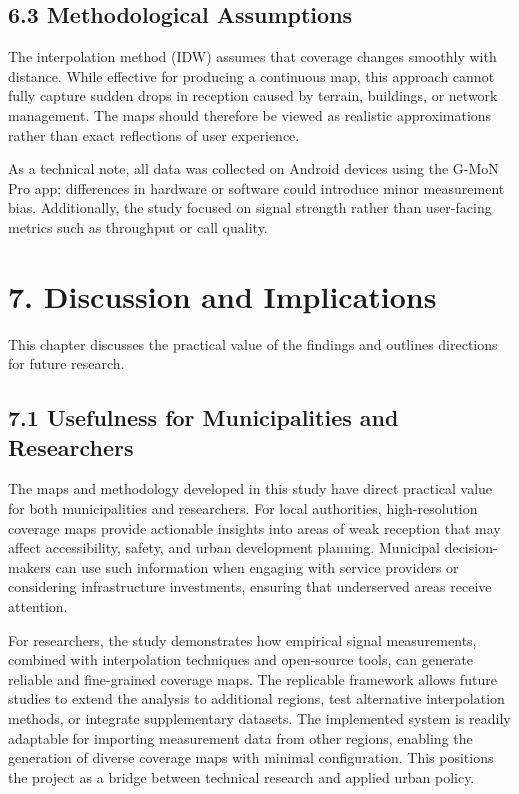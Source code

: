 \documentclass[11pt]{article}
\begin{document}
\hypertarget{methodological-assumptions}{%
\subsection{6.3 Methodological
Assumptions}\label{methodological-assumptions}}

The interpolation method (IDW) assumes that coverage changes smoothly
with distance. While effective for producing a continuous map, this
approach cannot fully capture sudden drops in reception caused by
terrain, buildings, or network management. The maps should therefore be
viewed as realistic approximations rather than exact reflections of user
experience.

As a technical note, all data was collected on Android devices using the
G-MoN Pro app; differences in hardware or software could introduce minor
measurement bias. Additionally, the study focused on signal strength
rather than user-facing metrics such as throughput or call quality.


\hypertarget{discussion-and-implications}{%
\section{7. Discussion and
Implications}\label{discussion-and-implications}}

This chapter discusses the practical value of the findings and outlines
directions for future research.

\hypertarget{usefulness-for-municipalities-and-researchers}{%
\subsection{7.1 Usefulness for Municipalities and
Researchers}\label{usefulness-for-municipalities-and-researchers}}

The maps and methodology developed in this study have direct practical
value for both municipalities and researchers. For local authorities,
high-resolution coverage maps provide actionable insights into areas of
weak reception that may affect accessibility, safety, and urban
development planning. Municipal decision-makers can use such information
when engaging with service providers or considering infrastructure
investments, ensuring that underserved areas receive attention.

For researchers, the study demonstrates how empirical signal
measurements, combined with interpolation techniques and open-source
tools, can generate reliable and fine-grained coverage maps. The
replicable framework allows future studies to extend the analysis to
additional regions, test alternative interpolation methods, or integrate
supplementary datasets. The implemented system is readily adaptable for
importing measurement data from other regions, enabling the generation
of diverse coverage maps with minimal configuration. This positions the
project as a bridge between technical research and applied urban policy.
\end{document}
